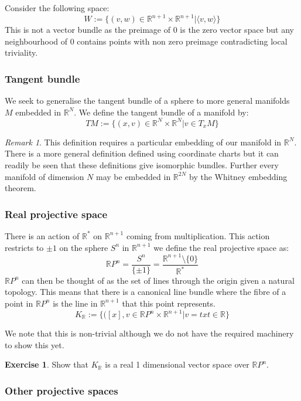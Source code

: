 \documentclass[a4paper,10pt]{article}
\theoremstyle{plain}%
\theoremstyle{definition}
\newtheorem{exer}{Exercise}
\theoremstyle{remark}
\newtheorem{rem}{Remark}
\newcommand{\RR}{\mathbb{R}}
\begin{document}
Consider the following space:
$$W:=\{ (v,w) \in \RR^{n+1}\times \RR^{n+1} | \langle v,w \rangle \}$$
This is not a vector bundle as the preimage of $0$ is the zero vector space but any neighbourhood of $0$ 
contains points with non zero preimage contradicting local triviality.

\subsubsection{Tangent bundle}

We seek to generalise the tangent bundle of a sphere to more general manifolds $M$ embedded in $\RR^N$.
We define the tangent bundle of a manifold by:
$$TM:=\{ (x,v)\in \RR^N\times\RR^N | v\in T_xM \}$$

\begin{rem}
 This definition requires a particular embedding of our manifold in $\RR^N$. There is a more general definition
defined using coordinate charts but it can readily be seen that these definitions give isomorphic bundles. Further 
every manifold of dimension $N$ may be embedded in $\RR^{2N}$ by the Whitney embedding theorem. 
\end{rem}


\subsubsection{Real projective space}

There is an action of $\RR^\ast$ on $\RR^{n+1}$ coming from multiplication. This action restricts to $\pm 1$ on 
the sphere $S^n$ in $\RR^{n+1}$ we define the real projective space as:
$$\RR P^n = \frac{S^n}{\{\pm 1\}} = \frac{\RR^{n+1}\setminus\{0\}}{\RR^\ast}$$
$\RR P^n$ can then be thought of as the set of lines through the origin given a natural topology. This means 
that there is a canonical line bundle where the fibre of a point in $\RR P^n$ is the line in $\RR^{n+1}$ that this 
point represents.
$$K_\RR := \{ ([x],v\in \RR P^n\times \RR^{n+1} | v=tx t\in \RR\}$$

We note that this is non-trivial although we do not have the required machinery to show this yet.

\begin{exer}
 Show that $K_\RR$ is a real 1 dimensional vector space over $\RR P^n$.
\end{exer}


\subsubsection{Other projective spaces}
\end{document}

